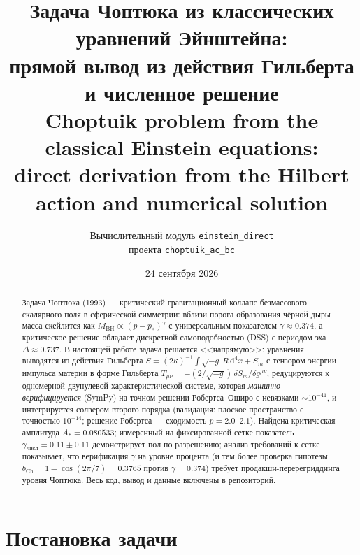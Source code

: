 \documentclass[11pt,a4paper]{article}
\title{\bfseries Задача Чоптюка из классических уравнений Эйнштейна:\\
прямой вывод из действия Гильберта и численное решение\\[4pt]
\large Choptuik problem from the classical Einstein equations:\\
direct derivation from the Hilbert action and numerical solution}
\author{Вычислительный модуль \texttt{einstein\_direct}\\
проекта \texttt{choptuik\_ac\_bc}}
\date{24 сентября 2026}
\newcommand{\dd}{\mathrm{d}}
\begin{document}
\maketitle

\begin{abstract}
Задача Чоптюка (1993) --- критический гравитационный коллапс безмассового
скалярного поля в сферической симметрии: вблизи порога образования чёрной дыры
масса скейлится как $M_{\mathrm{BH}}\propto (p-p_*)^{\gamma}$ с универсальным
показателем $\gamma\approx0.374$, а критическое решение обладает дискретной
самоподобностью (DSS) с периодом эха $\Delta\approx0.737$. В настоящей работе
задача решается <<напрямую>>: уравнения выводятся из действия Гильберта
$S=(2\kappa)^{-1}\!\int\!\sqrt{-g}\,R\,\dd^4x+S_m$ с тензором
энергии--импульса материи в форме Гильберта
$T_{\mu\nu}=-(2/\sqrt{-g})\,\delta S_m/\delta g^{\mu\nu}$, редуцируются к
одномерной двунулевой характеристической системе, которая \emph{машинно
верифицируется} (SymPy) на точном решении Робертса--Оширо с невязками
$\sim10^{-41}$, и интегрируется солвером второго порядка (валидация: плоское
пространство с точностью $10^{-14}$; решение Робертса --- сходимость
$p=2.0$--$2.1$). Найдена критическая амплитуда $A_*=0.080533$; измеренный на
фиксированной сетке показатель $\gamma_{\text{числ}}=0.11\pm0.11$ демонстрирует
пол по разрешению; анализ требований к сетке показывает, что верификация
$\gamma$ на уровне процента (и тем более проверка гипотезы
$b_{\mathrm{Ch}}=1-\cos(2\pi/7)=0.3765$ против $\gamma=0.374$) требует
продакшн-перерегриддинга уровня Чоптюка. Весь код, вывод и данные включены в
репозиторий.
\end{abstract}

\tableofcontents

\section{Постановка задачи}
\end{document}
